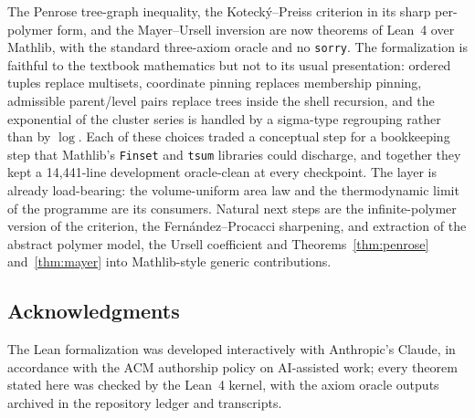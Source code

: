 \documentclass[11pt]{article}
\theoremstyle{definition}
\theoremstyle{remark}
\begin{document}
The Penrose tree-graph inequality, the Koteck\'y--Preiss criterion in its
sharp per-polymer form, and the Mayer--Ursell inversion are now theorems of
Lean~4 over Mathlib, with the standard three-axiom oracle and no
\texttt{sorry}.  The formalization is faithful to the textbook mathematics
but not to its usual presentation: ordered tuples replace multisets,
coordinate pinning replaces membership pinning, admissible parent/level
pairs replace trees inside the shell recursion, and the exponential of the
cluster series is handled by a sigma-type regrouping rather than by
$\log$.  Each of these choices traded a conceptual step for a bookkeeping
step that Mathlib's \texttt{Finset} and \texttt{tsum} libraries could
discharge, and together they kept a 14{,}441-line development
oracle-clean at every checkpoint.  The layer is already load-bearing: the
volume-uniform area law and the thermodynamic limit of the programme are
its consumers.  Natural next steps are the infinite-polymer version of the
criterion, the Fern\'andez--Procacci sharpening, and extraction of the
abstract polymer model, the Ursell coefficient and Theorems~\ref{thm:penrose}
and~\ref{thm:mayer} into Mathlib-style generic contributions.

\subsection*{Acknowledgments}
The Lean formalization was developed interactively with Anthropic's Claude,
in accordance with the ACM authorship policy on AI-assisted work; every
theorem stated here was checked by the Lean~4 kernel, with the axiom oracle
outputs archived in the repository ledger and transcripts.
\end{document}
